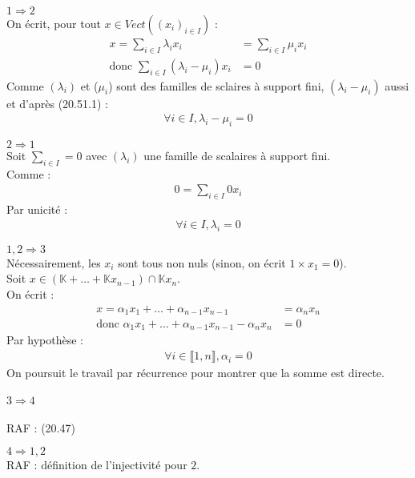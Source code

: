 \documentclass[../main.tex]{subfiles}
\begin{document}
$\boxed{1 \Rightarrow 2}$ \\
On écrit, pour tout $x \in Vect((x_i)_{i\in I})$ :
\begin{align*}
    x = \sum_{i\in I} \lambda_i x_i &= \sum_{i\in I} \mu_i x_i \\
    \text{donc } \sum_{i\in I} (\lambda_i - \mu_i) x_i &= 0
\end{align*}
Comme $(\lambda_i)$ et ($\mu_i$) sont des familles de sclaires à support fini, $(\lambda_i - \mu_i)$ aussi et d'après (20.51.1) : 
\begin{align*}
    \forall i \in I, \lambda_i - \mu_i = 0
\end{align*}

$\boxed{2 \Rightarrow 1}$ \\
Soit $\sum\limits_{i\in I} = 0$ avec $(\lambda_i)$ une famille de scalaires à support fini. \\
Comme : 
\begin{align*}
    0 = \sum_{i\in I} 0 x_i
\end{align*}
Par unicité :
\begin{align*}
    \forall i \in I, \lambda_i = 0
\end{align*}

$\boxed{1, 2 \Rightarrow 3}$ \\
Nécessairement, les $x_i$ sont tous non nuls (sinon, on écrit $1 \times x_1 = 0$). \\
Soit $x \in (\mathbb{K} + \ldots + \mathbb{K} x_{n-1}) \cap \mathbb{K} x_n$. \\
On écrit :
\begin{align*}
    x = \alpha_1 x_1 + \ldots + \alpha_{n-1} x_{n-1} &= \alpha_n x_n \\
    \text{donc } \alpha_1 x_1 + \ldots + \alpha_{n-1} x_{n-1} - \alpha_n x_n &= 0
\end{align*}
Par hypothèse : 
\begin{align*}
    \forall i \in \llbracket 1, n \rrbracket, \alpha_i = 0
\end{align*}
On poursuit le travail par récurrence pour montrer que la somme est directe. \\ \\

$\boxed{3 \Rightarrow 4}$ \\ \\
RAF : (20.47)

$\boxed{4 \Rightarrow 1, 2}$ \\
RAF : définition de l'injectivité pour $2$. 
\end{document}
